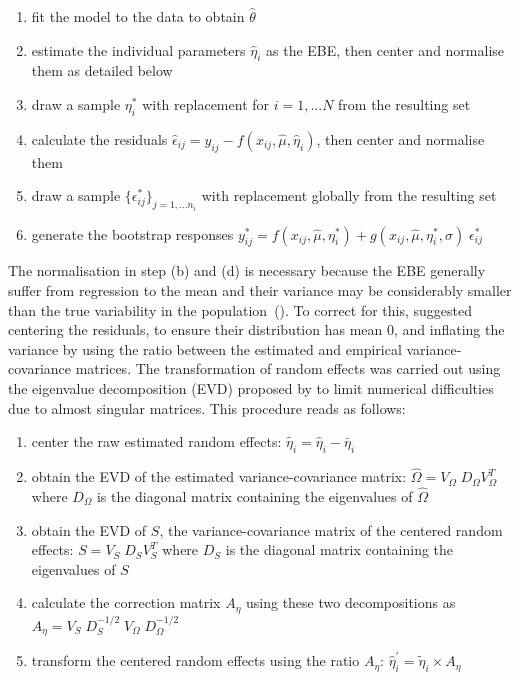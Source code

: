 \begin{enumerate}
  \item fit the model to the data to obtain $\hat{\theta}$
  \item estimate the individual parameters $\hat{\eta}_i$ as the EBE, then center and normalise them as detailed below
  \item draw a sample $\eta^*_i$ with replacement for $i=1,...N$ from the resulting set
  \item calculate the residuals $\hat{\epsilon}_{ij}= y_{ij}-f(x_{ij}, \hat{\mu}, \hat{\eta}_i) $, then center and normalise them
  \item draw a sample $\{\epsilon^{*}_{ij}\}_{j=1, \dots n_i}$ with replacement globally from the resulting set
  \item generate the bootstrap responses $y^{*}_{ij}=  f(x_{ij}, \hat{\mu}, \eta^*_i) + g(x_{ij}, \hat{\mu}, \eta^*_i, \sigma) \; \epsilon^*_{ij}$
\end{enumerate}

The normalisation in step (b) and (d) is necessary because the EBE generally suffer from regression to the mean and their variance may be considerably smaller than the true variability in the population~(\cite{Karlsson07}). To correct for this, \cite{Carpenter03} suggested centering the residuals, to ensure their distribution has mean 0, and inflating the variance by using the ratio between the estimated and empirical variance-covariance matrices. The transformation of random effects was carried out using the eigenvalue decomposition (EVD) proposed by \cite{Thai14} to limit numerical difficulties due to almost singular matrices. This procedure reads as follows:

\begin{enumerate}
  \item center the raw estimated random effects: $\tilde{\eta_i}=\hat{\eta}_i-\bar{\eta}_i$
  \item obtain the EVD of the estimated variance-covariance matrix: $\hat{\Omega} = V_{\Omega} \; D_{\Omega} V_{\Omega}^T$ where $ D_{\Omega} $ is the diagonal matrix containing the eigenvalues of $\hat{\Omega}$
  \item obtain the EVD of $S$, the variance-covariance matrix of the centered random effects:  $S = V_{S} \; D_{S} V_{S}^T$ where $D_S$ is the diagonal matrix containing the eigenvalues of $S$
  \item calculate the correction matrix $A_{\eta}$ using these two decompositions as \\
  $A_{\eta}= V_S \; D_S^{-1/2} \; V_{\Omega} \; D_{\Omega}^{-1/2} $
  \item transform the centered random effects using the ratio $A_\eta$: $\hat{\eta}^{'}_i=\tilde{\eta}_i \times A_\eta$
\end{enumerate}

